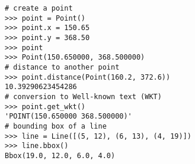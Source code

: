 \documentclass{article}
\begin{document}

\begin{lstlisting}
# create a point
>>> point = Point()
>>> point.x = 150.65
>>> point.y = 368.50
>>> point
>>> Point(150.650000, 368.500000)
# distance to another point
>>> point.distance(Point(160.2, 372.6))
10.39290623454286
# conversion to Well-known text (WKT)
>>> point.get_wkt()
'POINT(150.650000 368.500000)'
# bounding box of a line
>>> line = Line([(5, 12), (6, 13), (4, 19)])
>>> line.bbox()
Bbox(19.0, 12.0, 6.0, 4.0)
\end{lstlisting}
\end{document}
